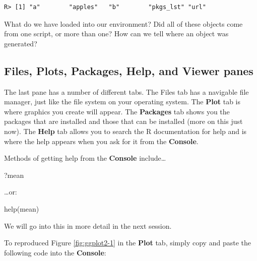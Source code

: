 \documentclass[
]{book}
\newenvironment{Shaded}{\begin{snugshade}}{\end{snugshade}}
\newcommand{\FunctionTok}[1]{\textcolor[rgb]{0.00,0.00,0.00}{#1}}
\newcommand{\NormalTok}[1]{#1}
\begin{document}
\begin{verbatim}
R> [1] "a"        "apples"   "b"        "pkgs_lst" "url"
\end{verbatim}

What do we have loaded into our environment? Did all of these objects come from one script, or more than one? How can we tell where an object was generated?

\hypertarget{files-plots-packages-help-and-viewer-panes}{%
\subsection{Files, Plots, Packages, Help, and Viewer panes}\label{files-plots-packages-help-and-viewer-panes}}

The last pane has a number of different tabs. The Files tab has a navigable file manager, just like the file system on your operating system. The \textbf{Plot} tab is where graphics you create will appear. The \textbf{Packages} tab shows you the packages that are installed and those that can be installed (more on this just now). The \textbf{Help} tab allows you to search the R documentation for help and is where the help appears when you ask for it from the \textbf{Console}.

Methods of getting help from the \textbf{Console} include\ldots{}

\begin{Shaded}
\begin{Highlighting}[]
\NormalTok{?mean}
\end{Highlighting}
\end{Shaded}

\ldots or:

\begin{Shaded}
\begin{Highlighting}[]
\FunctionTok{help}\NormalTok{(mean)}
\end{Highlighting}
\end{Shaded}

We will go into this in more detail in the next session.

To reproduced Figure \ref{fig:ggplot2-1} in the \textbf{Plot} tab, simply copy and paste the following code into the \textbf{Console}:
\end{document}
